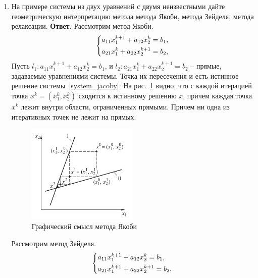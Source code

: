 \documentclass{article}
\begin{document}
\begin{enumerate}
        \item На примере системы из двух уравнений с двумя неизвестными
        дайте геометрическую интерпретацию метода метода
        Якоби, метода Зейделя, метода релаксации.
        \newline
        {\bfseries Ответ.}
        Рассмотрим метод Якоби.
        \begin{equation}
            \begin{dcases}
                a_{11}x_1^{k+1} + a_{12}x_2^k = b_1, \\
                a_{21}x_1^{k} + a_{22}x_2^{k+1} = b_2,
            \end{dcases}
            \label{system_jacoby}
        \end{equation}
        Пусть $l_1: a_{11}x_1^{k+1} + a_{12}x_2^k = b_1$, и 
        $l_2: a_{21}x_1^{k} + a_{22}x_2^{k+1} = b_2$ -- прямые, задаваемые уравнениями системы.
        Точка их пересечения и есть истинное решение системы~\eqref{system_jacoby}. 
        На рис.~\ref{jacoby_graph} видно, что с каждой итерацией точка $x^k = (x_1^k, x_2^k)$ 
        сходится к истинному решению $x$, причем каждая точка $x^k$ лежит внутри области, ограниченных прямыми.
        Причем ни одна из итеративных точек не лежит на прямых.
        \begin{figure}[H]
            \center
            \includegraphics[width=0.5\textwidth]{jacoby_graph.png}
            \caption{Графический смысл метода Якоби}
            \label{jacoby_graph}
        \end{figure}
        Рассмотрим метод Зейделя.
        \begin{equation}
            \begin{dcases}
                a_{11}x_1^{k+1} + a_{12}x_2^k = b_1, \\
                a_{21}x_1^{k+1} + a_{22}x_2^{k+1} = b_2,
            \end{dcases}
            \label{system_seidel}

\end{equation}
\end{enumerate}
\end{document}

